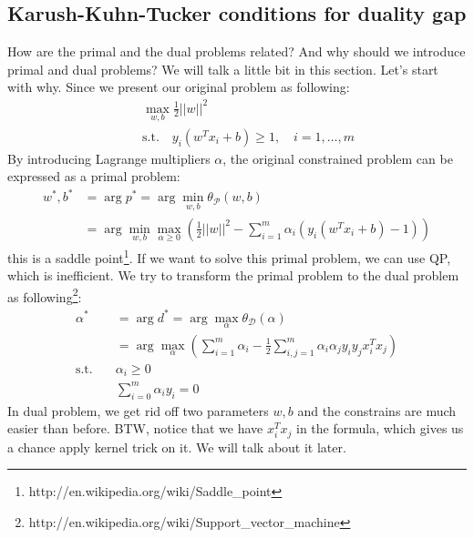 \documentclass[a4paper]{article}
\begin{document}
\subsection{Karush-Kuhn-Tucker conditions for duality gap }
How are the primal and the dual problems related? And why should we introduce primal and dual problems? We will talk a little bit in this section. Let's start with why. Since we present our original problem as following:
\begin{align*}
	& \max_{w, b} \frac{1}{2} ||w||^2 \\
	\quad & \text{s.t.} \quad y_i (w^T x_i + b) \geq 1, \quad i = 1, \dots, m
\end{align*}
By introducing Lagrange multipliers $\alpha$, the original constrained problem can be expressed as a primal problem:
\begin{align*}
	w^\ast, b^\ast &= \arg p^\ast = \arg \min_{w, b}\theta_{\mathcal{P}}(w, b) \\
	&= \arg \min_{w, b} \max_{\alpha \geq 0} (\frac{1}{2} ||w||^2 - \sum_{i=1}^{m}\alpha_i (y_i(w^T x_i +b) - 1))
\end{align*}
this is a saddle point\footnote{http://en.wikipedia.org/wiki/Saddle\_point}. If we want to solve this primal problem, we can use QP, which is inefficient. We try to transform the primal problem to the dual problem as following\footnote{http://en.wikipedia.org/wiki/Support\_vector\_machine}:
\begin{align*}
	\alpha^\ast &= \arg d^\ast = \arg \max_{\alpha} \theta_{\mathcal{D}} (\alpha) \\
		&= \arg \max_{\alpha} (\sum_{i=1}^{m}\alpha_i - \frac{1}{2}\sum_{i,j=1}^{m}\alpha_i \alpha_j y_i y_j x_i^T x_j) \\ 
		\text{s.t.} \quad & \alpha_i \geq 0 \\
		\quad & \sum_{i=0}^{m} \alpha_i y_i = 0
\end{align*}
In dual problem, we get rid off two parameters $w, b$ and the constrains are much easier than before. BTW, notice that we have $x_i^T x_j$ in the formula, which gives us a chance apply kernel trick on it. We will talk about it later. 
\end{document}
